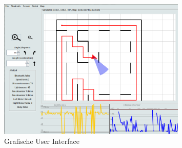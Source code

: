 \documentclass[t1]{penoverslag}
\begin{document}
\begin{figure}[tbp]
\begin{center}
    \includegraphics[width=0.8\textwidth]{GUI}
    \caption{Grafische User Interface}
	\label{fig:gui}
\end{center}
\end{figure}
\end{document}
